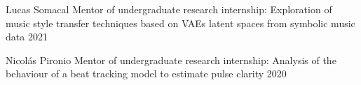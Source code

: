 


\begin{mentorships}

    \mentorship
    {Lucas Somacal}
    {Mentor of undergraduate research internship: Exploration of music
style transfer techniques based on VAEs latent spaces from symbolic music data}
    {2021}

    \mentorship
    {Nicolás Pironio}
    {Mentor of undergraduate research internship: Analysis of the
    behaviour of a beat tracking model to estimate pulse clarity}
    {2020}

\end{mentorships}
